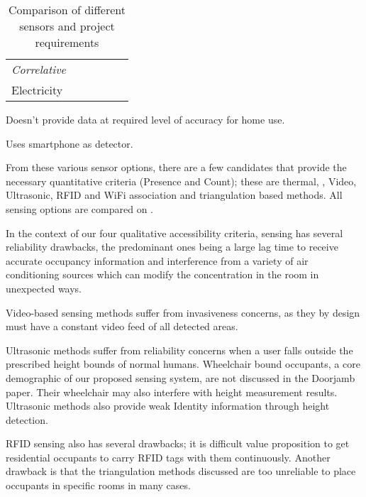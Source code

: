 \documentclass[../thesis/thesis.tex]{subfiles}
\begin{document}
\begin{table}
\begin{threeparttable}
\begin{tabularx}{\textwidth}{|l|l|l||l||l|l|}
\hspace{3mm}\textit{Correlative} 	& & & & & \\
\hspace{8mm}Electricity 		& \cmark\ssup & \xmark & \cmark & & \\

\cline{1-6}
\end{tabularx}
\begin{tablenotes}
\item \ssup  Doesn't provide data at required level of accuracy for home use.
\item \tsup  Uses smartphone as detector.
\end{tablenotes}
\end{threeparttable}
\caption{Comparison of different sensors and project requirements}
\label{tab:litreview:taxonomycomp}
\end{table}

From these various sensor options, there are a few candidates that provide the necessary quantitative criteria (Presence and Count); these are thermal, \cdi, Video, Ultrasonic, RFID and WiFi association and triangulation based methods. All sensing options are compared on .

In the context of our four qualitative accessibility criteria, \cdi sensing has several reliability drawbacks, the predominant ones being a large lag time to receive accurate occupancy information and interference from a variety of air conditioning sources which can modify the \cdi concentration in the room in unexpected ways.

Video-based sensing methods suffer from invasiveness concerns, as they by design must have a constant video feed of all detected areas.

Ultrasonic methods suffer from reliability concerns when a user falls outside the prescribed height bounds of normal humans. Wheelchair bound occupants, a core demographic of our proposed sensing system, are not discussed in the Doorjamb paper. Their wheelchair may also interfere with height measurement results. Ultrasonic methods also provide weak Identity information through height detection.

RFID sensing also has several drawbacks; it is difficult value proposition to get residential occupants to carry RFID tags with them continuously. Another drawback is that the triangulation methods discussed are too unreliable to place occupants in specific rooms in many cases.
\end{document}
